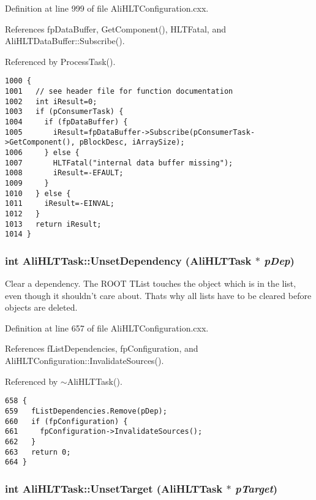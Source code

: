 Definition at line 999 of file Ali\-HLTConfiguration.cxx.

References fp\-Data\-Buffer, Get\-Component(), HLTFatal, and Ali\-HLTData\-Buffer::Subscribe().

Referenced by Process\-Task().

\footnotesize\begin{verbatim}1000 {
1001   // see header file for function documentation
1002   int iResult=0;
1003   if (pConsumerTask) {
1004     if (fpDataBuffer) {
1005       iResult=fpDataBuffer->Subscribe(pConsumerTask->GetComponent(), pBlockDesc, iArraySize);
1006     } else {
1007       HLTFatal("internal data buffer missing");
1008       iResult=-EFAULT;
1009     }
1010   } else {
1011     iResult=-EINVAL;
1012   }
1013   return iResult;
1014 }
\end{verbatim}\normalsize 


\subsubsection{\setlength{\rightskip}{0pt plus 5cm}int Ali\-HLTTask::Unset\-Dependency ({\bf Ali\-HLTTask} $\ast$ {\em p\-Dep})}\label{classAliHLTTask_a12}


Clear a dependency. The ROOT TList touches the object which is in the list, even though it shouldn't care about. Thats why all lists have to be cleared before objects are deleted. 

Definition at line 657 of file Ali\-HLTConfiguration.cxx.

References f\-List\-Dependencies, fp\-Configuration, and Ali\-HLTConfiguration::Invalidate\-Sources().

Referenced by $\sim$Ali\-HLTTask().

\footnotesize\begin{verbatim}658 {
659   fListDependencies.Remove(pDep);
660   if (fpConfiguration) {
661     fpConfiguration->InvalidateSources();
662   }
663   return 0;
664 }
\end{verbatim}\normalsize 


\subsubsection{\setlength{\rightskip}{0pt plus 5cm}int Ali\-HLTTask::Unset\-Target ({\bf Ali\-HLTTask} $\ast$ {\em p\-Target})}\label{classAliHLTTask_a17}


